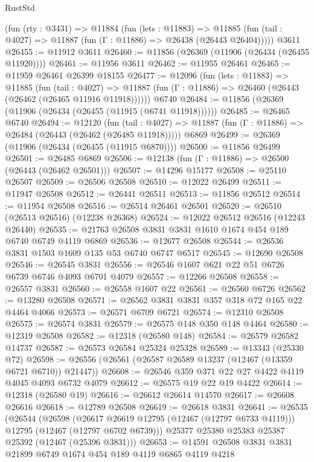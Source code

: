 \begin{lexlean}{RustStd}
\begin{coremodule}
    (fun (rty : @3431) =>
    @11884
      (fun (lets : @11883) =>
      @11885 (fun (tail : @4027) => @11887 (fun (Γ : @11886) => @26438 (@26443 @26404)))))
    @3611
@26455 := @11912 @3611
@26460 := @11856 (@26369 (@11906 (@26434 (@26455 @11920))))
@26461 := @11956 @3611
@26462 := @11955 @26461
@26465 := @11959 @26461 @26399 @18155
@26477 := @12096
    (fun (lets : @11883) =>
    @11885
      (fun (tail : @4027) =>
      @11887 (fun (Γ : @11886) => @26460 (@26443 (@26462 (@26465 @11916 @11918))))))
    @6740
@26484 := @11856 (@26369 (@11906 (@26434 (@26455 (@11915 (@6741 @11918))))))
@26485 := @26465 @6740
@26494 := @12120
    (fun (tail : @4027) => @11887 (fun (Γ : @11886) => @26484 (@26443 (@26462 (@26485 @11918)))))
    @6869
@26499 := @26369 (@11906 (@26434 (@26455 (@11915 @6870))))
@26500 := @11856 @26499
@26501 := @26485 @6869
@26506 := @12138 (fun (Γ : @11886) => @26500 (@26443 (@26462 @26501)))
@26507 := @14296 @15177
@26508 := @25110 @26507
@26509 := @26506 @26508
@26510 := @12022 @26499
@26511 := @11947 @26508
@26512 := @26441 @26511
@26513 := @11856 @26512
@26514 := @11954 @26508
@26516 := @26514 @26461 @26501
@26520 := @26510 (@26513 @26516) (@12238 @26368)
@26524 := @12022 @26512 @26516 (@12243 @26440)
@26535 := @21763 @26508 @3831 @3831 @1610 @1674 @454 @189 @6740 @6749 @4119 @6869
@26536 := @12677 @26508
@26544 := @26536 @3831 @1503 @1609 @135 @53 @6740 @6747 @6517
@26545 := @12690 @26508
@26546 := @26545 @3831
@26556 := @26546 @1607 @621 @22 @51 @6726 @6739 @6746 @4093 @6701 @4079
@26557 := @12266 @26508
@26558 := @26557 @3831
@26560 := @26558 @1607 @22
@26561 := @26560 @6726
@26562 := @13280 @26508
@26571 := @26562 @3831 @3831 @357 @318 @72 @165 @22 @4464 @4066
@26573 := @26571 @6709 @6721
@26574 := @12310 @26508
@26575 := @26574 @3831
@26579 := @26575 @148 @350 @148 @4464
@26580 := @12319 @26508
@26582 := @12318 (@26580 @148)
@26584 := @26579 @26582 @14737
@26587 := @26573 @26584 @25324 @25328
@26589 := @13343 (@25330 @72)
@26598 := @26556 (@26561 (@26587 @26589 @13237 (@12467 (@13359 @6721 @6710)) @21447))
@26608 := @26546 @359 @371 @22 @27 @4422 @4119 @4045 @4093 @6732 @4079
@26612 := @26575 @19 @22 @19 @4422
@26614 := @12318 (@26580 @19)
@26616 := @26612 @26614 @14570
@26617 := @26608 @26616
@26618 := @12789 @26508
@26619 := @26618 @3831
@26641 := @26535
    (@26544
      (@26598
        (@26617 @26619 @12795 (@12467 (@12797 @6733 @4119)))
        @12795
        (@12467 (@12797 @6702 @6739)))
      @25377
      @25380
      @25383
      @25387
      @25392
      (@12467 (@25396 @3831)))
@26653 := @14591 @26508 @3831 @3831 @21899 @6749 @1674 @454 @189 @4119 @6865 @4119 @4218

\end{coremodule}
\end{lexlean}
